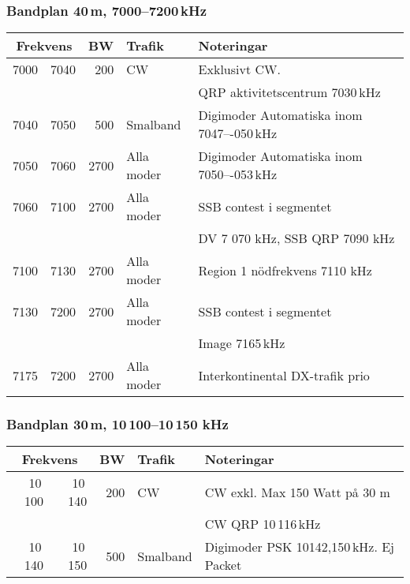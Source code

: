 \subsubsection{Bandplan 40\,m, 7000--7200\,kHz}
\begin{tabular}{rrrll}
\multicolumn{2}{c}{\textbf{Frekvens}} & \textbf{BW} & \textbf{Trafik} & \textbf{Noteringar} \\ \hline
7000 & 7040 & 200  & CW         & Exklusivt CW.                             \\
     &      &      &            & QRP aktivitetscentrum 7030\,kHz           \\ \hline
7040 & 7050 & 500  & Smalband   & Digimoder Automatiska inom 7047–-050\,kHz \\ \hline
7050 & 7060 & 2700 & Alla moder & Digimoder Automatiska inom 7050–-053\,kHz \\ \hline
7060 & 7100 & 2700 & Alla moder & SSB contest i segmentet                   \\
     &      &      &            & DV 7 070 kHz, SSB QRP 7090 kHz            \\ \hline
7100 & 7130 & 2700 & Alla moder & Region 1 nödfrekvens 7110 kHz             \\ \hline
7130 & 7200 & 2700 & Alla moder & SSB contest i segmentet                   \\
     &      &      &            & Image 7165\,kHz                           \\ \hline
7175 & 7200 & 2700 & Alla moder & Interkontinental DX-trafik prio           \\ \hline
\end{tabular}

\subsubsection{Bandplan 30\,m, 10\,100--10\,150 kHz}
\begin{tabular}{rrrll}
\multicolumn{2}{c}{\textbf{Frekvens}} & \textbf{BW} & \textbf{Trafik} & \textbf{Noteringar} \\ \hline
10\,100 & 10\,140 & 200 & CW       & CW exkl. Max 150 Watt på 30 m           \\
        &         &     &          & CW QRP 10\,116\,kHz                     \\ \hline
10\,140 & 10\,150 & 500 & Smalband & Digimoder PSK 10142,150\,kHz. Ej Packet \\ \hline
\end{tabular}

